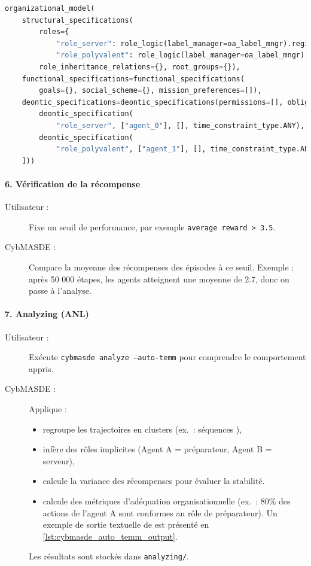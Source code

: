 \begin{lstlisting}[language=Python,basicstyle=\scriptsize, label={lst:org_spec_oa}, caption={Extrait du fichier de configuration organisationnelle pour Overcooked-AI}]
    organizational_model(
    structural_specifications(
        roles={
            "role_server": role_logic(label_manager=oa_label_mngr).registrer_script_rule(primary_fun),
            "role_polyvalent": role_logic(label_manager=oa_label_mngr).registrer_script_rule(secondary_fun)},
        role_inheritance_relations={}, root_groups={}),
    functional_specifications=functional_specifications(
        goals={}, social_scheme={}, mission_preferences=[]),
    deontic_specifications=deontic_specifications(permissions=[], obligations=[
        deontic_specification(
            "role_server", ["agent_0"], [], time_constraint_type.ANY),
        deontic_specification(
            "role_polyvalent", ["agent_1"], [], time_constraint_type.ANY)
    ]))
\end{lstlisting}

\paragraph{6. Vérification de la récompense}
\begin{description}
  \item[Utilisateur :] Fixe un seuil de performance, par exemple \texttt{average reward > 3.5}.
  \item[CybMASDE :] Compare la moyenne des récompenses des épisodes à ce seuil.
    Exemple : après 50 000 étapes, les agents atteignent une moyenne de 2.7, donc on passe à l’analyse.
\end{description}

\paragraph{7. Analyzing (ANL)}
\begin{description}
  \item[Utilisateur :] Exécute \texttt{cybmasde analyze --auto-temm} pour comprendre le comportement appris.
  \item[CybMASDE :] Applique  :
    \begin{itemize}
      \item regroupe les trajectoires en clusters (ex.~: séquences ),
      \item infère des rôles implicites (Agent A = préparateur, Agent B = serveur),
      \item calcule la variance des récompenses pour évaluer la stabilité.
      \item calcule des métriques d’adéquation organisationnelle (ex.~: 80\% des actions de l’agent A sont conformes au rôle de préparateur). Un exemple de sortie textuelle de  est présenté en \autoref{lst:cybmasde_auto_temm_output}.
    \end{itemize}
    Les résultats sont stockés dans \texttt{analyzing/}.
\end{description}

